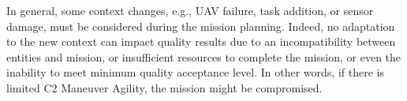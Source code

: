 In general, some context changes, e.g., UAV failure, task addition, or sensor damage, must be considered during the mission planning. Indeed, no adaptation to the new context can impact quality results due to an incompatibility between entities and mission, or insufficient resources to complete the mission, or even the inability to meet minimum quality acceptance level. In other words, if there is limited C2 Maneuver Agility, the mission might be compromised.


